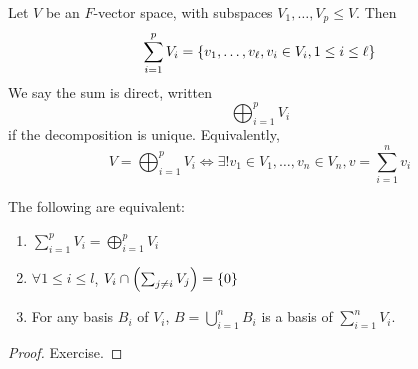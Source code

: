 \begin{definition}
	Let \( V \) be an \( F \)-vector space, with subspaces \( V_1, \dots, V_p \leq V \).
	Then
	\[
		\sum_{i=1}^p V_i = \qty{ v_1, \dots, v_\ell, v_i \in V_i, 1 \leq i \leq \ell}
	\]
	We say the sum is direct, written
	\[
		\bigoplus_{i=1}^p V_i
	\]
	if the decomposition is unique.
	Equivalently,
	\[
		V = \bigoplus_{i=1}^p V_i \iff \exists!
		v_1 \in V_1, \dots, v_n \in V_n, v = \sum_{i=1}^n v_i
	\]
\end{definition}
\begin{lemma}
	The following are equivalent:
	\begin{enumerate}
		\item \( \sum_{i=1}^p V_i = \bigoplus_{i=1}^p V_i \)
		\item \( \forall 1 \leq i \leq l \), \( V_i \cap \qty( \sum_{j \neq i} V_j ) = \{0\} \)
		\item For any basis \( B_i \) of \( V_i \), \( B = \bigcup_{i=1}^n B_i \) is a basis of \( \sum_{i=1}^n V_i \).
	\end{enumerate}
\end{lemma}
\begin{proof}
	Exercise.
\end{proof}
